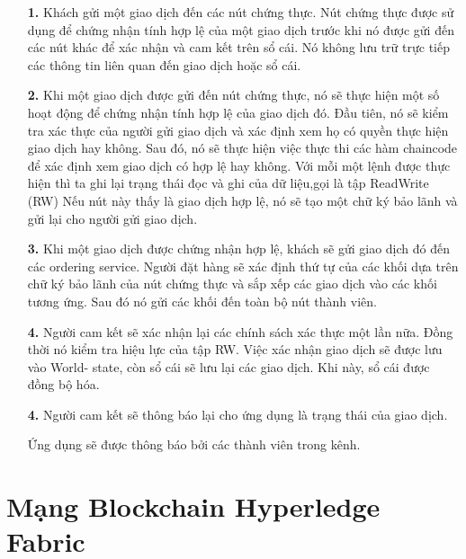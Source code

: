 \begin{itemize}
    \item[\textbf{1.}] Khách gửi một giao dịch đến các  nút chứng thực. Nút chứng thực được sử dụng để chứng nhận tính hợp 
    lệ của một giao dịch trước khi nó được gửi đến các nút khác để xác nhận và cam kết trên 
    sổ cái. Nó không lưu trữ trực tiếp các thông tin liên quan đến giao dịch hoặc sổ cái.
    \item[\textbf{2.}] Khi một giao dịch được gửi đến nút chứng thực, nó sẽ thực hiện một số hoạt 
    động để chứng nhận tính hợp lệ của giao dịch đó. Đầu tiên, nó sẽ kiểm 
    tra xác thực của người gửi giao dịch và xác định xem họ có quyền thực hiện giao dịch hay 
    không. Sau đó, nó sẽ thực hiện việc thực thi các hàm chaincode để xác 
    định xem giao dịch có hợp lệ hay không. Với mỗi một lệnh được thực hiện thì ta ghi lại 
    trạng thái đọc và ghi của dữ liệu,gọi là tập ReadWrite (RW)
    Nếu nút này thấy là giao dịch hợp lệ, nó sẽ tạo một chữ ký bảo lãnh và gửi lại cho người 
    gửi giao dịch. 
    \item[\textbf{3.}] Khi một giao dịch được chứng nhận hợp lệ, khách sẽ gửi giao dịch
    đó đến các ordering service. Người đặt hàng sẽ xác định thứ tự của các khối dựa trên 
    chữ ký bảo lãnh của nút chứng thực và sắp xếp các giao dịch vào các khối tương 
    ứng. Sau đó nó gửi các khối đến toàn bộ nút thành viên.
    \item[\textbf{4.}] Người cam kết sẽ xác nhận lại các chính sách xác thực một lần nữa. 
    Đồng thời nó kiểm tra hiệu lực của tập RW. Việc xác nhận giao dịch sẽ được lưu vào World- state, còn sổ cái sẽ lưu lại các giao dịch. 
    Khi này, sổ cái được đồng bộ hóa.
    \item[\textbf{4.}] Người cam kết sẽ thông báo lại cho ứng dụng là trạng thái của giao dịch. 
    
    Ứng dụng sẽ được thông báo bởi các thành viên trong kênh.
\end{itemize}

\section{Mạng Blockchain Hyperledge Fabric}